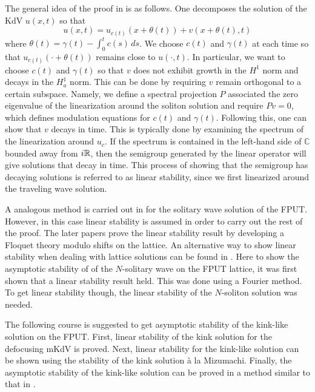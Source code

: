 The general idea of the proof in \cite{pego1994asymptotic} is as follows. One decomposes the solution of the KdV \(u(x,t)\) so that
\begin{equation*} 
	u(x,t)  = u_{c(t)} (x + \theta(t)) + v(x + \theta(t), t)
\end{equation*} 
where \(\theta(t) = \gamma(t) - \int_0^t c(s)\, ds\). We choose \(c(t)\) and \(\gamma(t)\) at each time so that \(u_{c(t)} (\cdot + \theta(t))\) remains close to \(u(\cdot, t)\). In particular, we want to choose \(c(t)\) and \(\gamma(t)\) so that \(v\) does not exhibit growth in the \(H^1\) norm and decays in the \(H^1_a\) norm. This can be done by requiring \(v\) remain orthogonal to a certain subspace. Namely, we define a spectral projection \(P\) associated the zero eigenvalue of the linearization around the soliton solution and require \(P v = 0\), which defines modulation equations for \(c(t)\) and \(\gamma(t)\). Following this, one can show that \(v\) decays in time. This is typically done by examining the spectrum of the linearization around \(u_{c}\). If the spectrum is contained in the left-hand side of \(\mathbb C\) bounded away from \(i\mathbb{R}\), then the semigroup generated by the linear operator will give solutions that decay in time. This process of showing that the semigroup has decaying solutions is referred to as linear stability, since we first linearized around the traveling wave solution.

A analogous method is carried out in \cite{friesecke2002solitary} for the solitary wave solution of the FPUT. However, in this case linear stability is assumed in order to carry out the rest of the proof. The later papers \cite{friesecke2003solitary,friesecke2004solitary} prove the linear stability result by developing a Floquet theory modulo shifts on the lattice. An alternative way to show linear stability when dealing with lattice solutions can be found in \cite{mizumachi2013asymptotic}. Here to show the asymptotic stability of of the \(N\)-solitary wave on the FPUT lattice, it was first shown that a linear stability result held. This was done using a Fourier method. To get linear stability though, the linear stability of the \(N\)-soliton solution was needed.

The following course is suggested to get asymptotic stability of the kink-like solution on the FPUT. First, linear stability of the kink solution for the defocusing mKdV is proved. Next, linear stability for the kink-like solution can be shown using the stability of the kink solution \`a la Mizumachi. Finally, the asymptotic stability of the kink-like solution can be proved in a method similar to that in \cite{friesecke2002solitary}.

